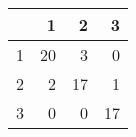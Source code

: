 \begin{tabular}{rrrr}
  \hline
 & 1 & 2 & 3 \\ 
  \hline
1 &  20 &   3 &   0 \\ 
  2 &   2 &  17 &   1 \\ 
  3 &   0 &   0 &  17 \\ 
   \hline
\end{tabular}
